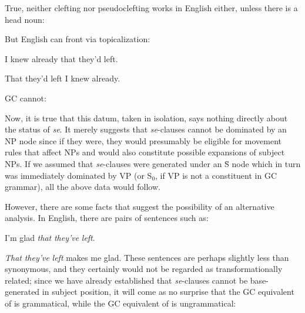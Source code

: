 \z

\z

\z

\z

\z

\z

\noindent True, neither clefting nor pseudoclefting works in English either, unless there is a head noun:

\z

\z
But English can front via topicalization:

\ea\label{ex:2:177}
I knew already that they'd left.
\z

\ea\label{ex:2:178}
That they'd left I knew already.
\z

\noindent GC cannot:

\z

\z

Now, it is true that this datum, taken in isolation, says nothing directly about the status of \textit{se}. It merely suggests that \textit{se}-clauses cannot be dominated by an NP node since if they were, they would presumably be eligible for movement rules that affect NPs and would also constitute possible expansions of subject NPs. If we assumed that \textit{se}-clauses were generated under an \=S node which in turn was immediately dominated by VP (or S$_0$, if VP is not a constituent in GC grammar), all the above data would follow.

However, there are some facts that suggest the possibility of
an alternative analysis. In English, there are pairs of sentences such as:

\ea\label{ex:2:181}
I'm glad \textit{that} \textit{they've} \textit{left}.
\z

\ea\label{ex:2:182}
\textit{That} \textit{they've} \textit{left} makes me glad.
\z
These sentences are perhaps slightly less than synonymous, and they certainly would not be regarded as transformationally related; since we have already established that \textit{se}-clauses cannot be base-generated in subject position, it will come as no surprise that the GC equivalent of  is grammatical, while the GC equivalent of  is ungrammatical:

